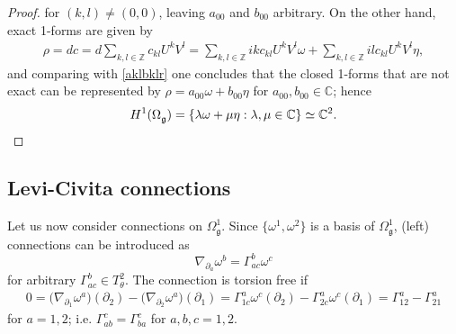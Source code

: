 \documentclass{amsart}
\newcommand{\complex}{\mathbb{C}}
\newcommand{\integers}{\mathbb{Z}}
\newcommand{\paraa}[1]{\big(#1\big)}
\theoremstyle{definition}
\theoremstyle{remark}
\numberwithin{equation}{section}
\renewcommand{\d}{\partial}
\newcommand{\g}{\mathfrak{g}}
\newcommand{\Omegag}[1]{\Omega^{#1}_{\g}}
\newcommand{\Omegaoneg}{\Omega^1_{\g}}
\newcommand{\Ttwotheta}{T^2_{\theta}}
\begin{document}
\begin{proof}
  for $(k,l)\neq(0,0)$, leaving $a_{00}$ and $b_{00}$ arbitrary.  On
  the other hand, exact 1-forms are given by
  \begin{align*}
    \rho = dc = d\sum_{k,l\in\integers}c_{kl}U^kV^l
    = \sum_{k,l\in\integers}ikc_{kl}U^kV^l\omega+\sum_{k,l\in\integers}ilc_{kl}U^kV^l\eta,
  \end{align*}
  and comparing with \eqref{aklbklr} one concludes that the
  closed 1-forms that are not exact can be represented by
  $\rho = a_{00}\omega + b_{00}\eta$ for $a_{00},b_{00}\in\complex$;
  hence
  \begin{equation}
    H^1(\Omegag{}) = \{\lambda\omega + \mu\eta:\lambda,\mu\in\complex\} \simeq \complex^2.\qedhere
  \end{equation}
\end{proof}

\subsection{Levi-Civita connections}

Let us now consider connections on $\Omegaoneg$. Since
$\{\omega^1,\omega^2\}$ is a basis of $\Omegaoneg$, (left) connections can be
introduced as
\begin{equation}\label{eq:left.conn.def}
  \nabla_{\d_a}\omega^b = \Gamma_{ac}^b\omega^c
\end{equation}
for arbitrary $\Gamma_{ac}^b\in\Ttwotheta$. The connection is torsion
free if
\begin{align*}
  0 = \paraa{\nabla_{\d_1}\omega^a}(\d_2)-\paraa{\nabla_{\d_2}\omega^a}(\d_1)
  =\Gamma_{1c}^a\omega^c(\d_2) - \Gamma_{2c}^a\omega^c(\d_1)
  = \Gamma^a_{12}-\Gamma^a_{21}
\end{align*}
for $a=1,2$; i.e. $\Gamma_{ab}^c=\Gamma_{ba}^c$ for $a,b,c=1,2$.
\end{document}
